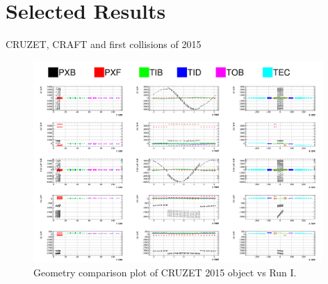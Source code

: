 \section{Selected Results}
\label{sec:alignmentResults}
CRUZET, CRAFT and first collisions of 2015

\begin{figure}[htb]
    \begin{center}
        \includegraphics[width=0.98\textwidth]{../figs/Alignment/global_tracker_2_final.png}
    \end{center}
    \caption{Geometry comparison plot of CRUZET 2015 object vs Run I.}
    \label{fig:trackAndResiduals}
\end{figure}


